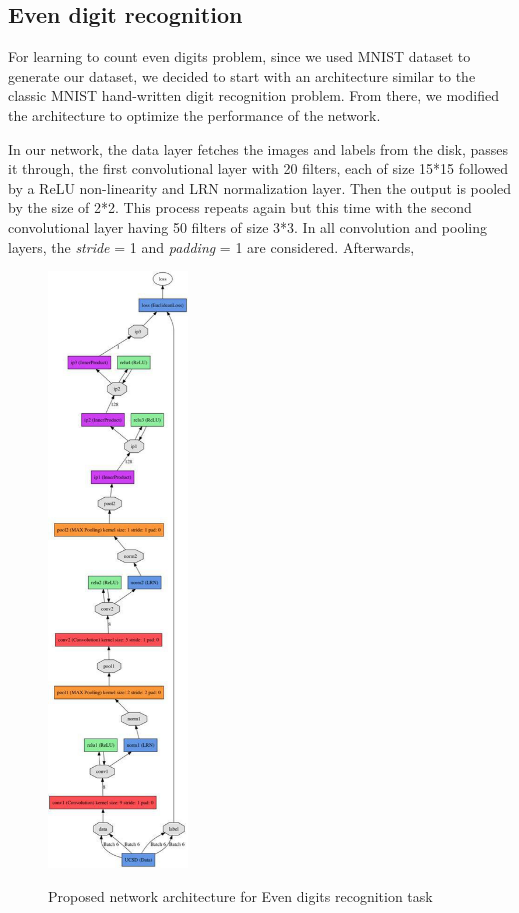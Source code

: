 \subsection{Even digit recognition}
\label{subsubsec:digitarch}
For learning to count even digits problem, since we used MNIST dataset to generate our dataset, we decided to start with an architecture similar to the classic MNIST hand-written digit recognition problem\cite{lecun1995comparison}. From there, we modified the architecture to optimize the performance of the network.

\indent In our network, the data layer fetches the images and labels from the disk, passes it through, the first convolutional layer with 20 filters, each of size 15*15 followed by a ReLU non-linearity and LRN normalization layer. Then the output is pooled by the size of 2*2. This process repeats again but this time with the second convolutional layer having 50 filters of size 3*3. In all convolution and pooling layers, the \textit{stride} = 1 and \textit{padding} = 1 are considered. Afterwards,

\begin{figure}
  \centering
   {\includegraphics[width=0.33\textwidth]{images/model}}
	\caption{Proposed network architecture for Even digits recognition task}
	\label{fig:l2cNet}
\end{figure}

